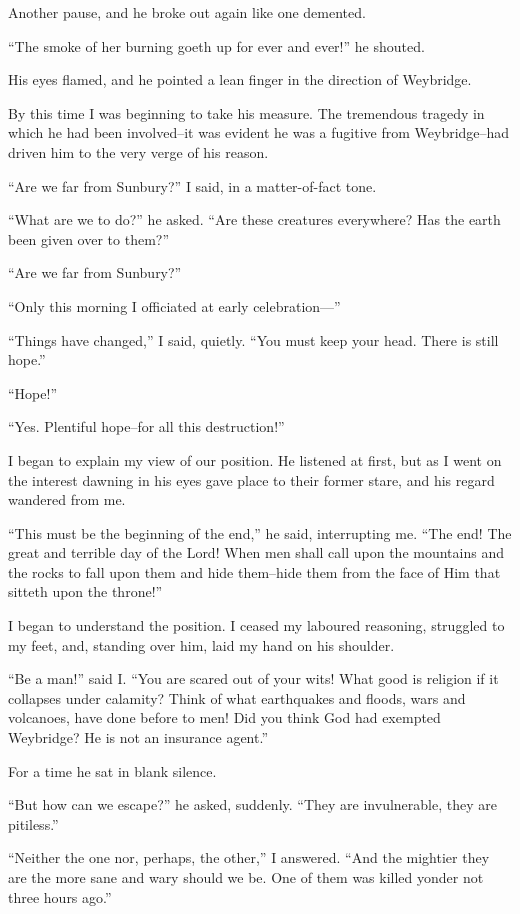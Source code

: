 Another pause, and he broke out again like one demented.

``The smoke of her burning goeth up for ever and ever!'' he shouted.

His eyes flamed, and he pointed a lean finger in the direction of
Weybridge.

By this time I was beginning to take his measure. The tremendous
tragedy in which he had been involved--it was evident he was a
fugitive from Weybridge--had driven him to the very verge of his
reason.

``Are we far from Sunbury?'' I said, in a matter-of-fact tone.

``What are we to do?'' he asked. ``Are these creatures everywhere? Has
the earth been given over to them?''

``Are we far from Sunbury?''

``Only this morning I officiated at early celebration---''

``Things have changed,'' I said, quietly. ``You must keep your head.
There is still hope.''

``Hope!''

``Yes. Plentiful hope--for all this destruction!''

I began to explain my view of our position. He listened at first,
but as I went on the interest dawning in his eyes gave place to
their former stare, and his regard wandered from me.

``This must be the beginning of the end,'' he said, interrupting me.
``The end! The great and terrible day of the Lord! When men shall
call upon the mountains and the rocks to fall upon them and hide
them--hide them from the face of Him that sitteth upon the
throne!''

I began to understand the position. I ceased my laboured reasoning,
struggled to my feet, and, standing over him, laid my hand on his
shoulder.

``Be a man!'' said I. ``You are scared out of your wits! What good is
religion if it collapses under calamity? Think of what earthquakes
and floods, wars and volcanoes, have done before to men! Did you
think God had exempted Weybridge? He is not an insurance agent.''

For a time he sat in blank silence.

``But how can we escape?'' he asked, suddenly. ``They are
invulnerable, they are pitiless.''

``Neither the one nor, perhaps, the other,'' I answered. ``And the
mightier they are the more sane and wary should we be. One of them
was killed yonder not three hours ago.''

